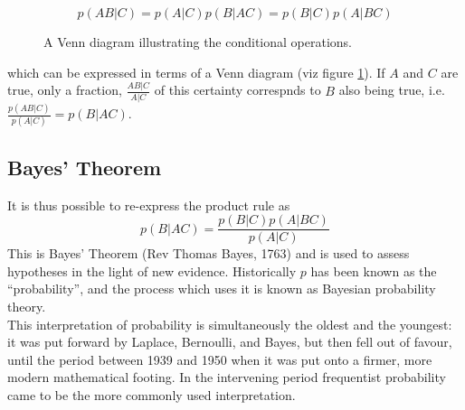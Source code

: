 \documentclass{dwnotes}         		        %
\begin{document}
\begin{equation}
  \label{eq:plausibilityproduct}
  p(AB|C) = p(A|C)p(B|AC) = p(B|C)p(A|BC)
\end{equation}
\begin{figure}
  \centering
  
  \caption{A Venn diagram illustrating the conditional operations.}
  \label{fig:conditionalvenn}
\end{figure}
which can be expressed in terms of a Venn diagram (viz figure
\ref{fig:conditionalvenn}).  If $A$ and $C$ are true, only a fraction,
$\frac{AB|C}{A|C}$ of this certainty correspnds to $B$ also being
true, i.e. $\frac{p(AB|C)}{p(A|C)} = p(B|AC)$.

\subsection{Bayes' Theorem}
\label{sec:bayestheorem}

It is thus possible to re-express the product rule as
\begin{equation}
  \label{eq:bayestheorem}
  p(B|AC) = \frac{ p(B|C) p(A|BC) }{ p(A|C) }
\end{equation}
This is Bayes' Theorem (Rev Thomas Bayes, 1763) and is used to assess hypotheses in the light of new evidence. Historically $p$ has been known as the ``probability'', and the process which uses it is known as Bayesian probability theory. \\
This interpretation of probability is simultaneously the oldest and
the youngest: it was put forward by Laplace, Bernoulli, and Bayes, but
then fell out of favour, until the period between 1939 and 1950 when
it was put onto a firmer, more modern mathematical footing. In the
intervening period frequentist probability came to be the more
commonly used interpretation.
\end{document}
